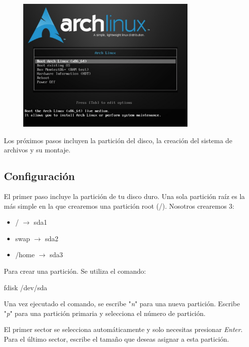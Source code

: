 \documentclass[11pt,letterpaper]{article}
\begin{document}
 \begin{figure}[H]
        \centering
        \includegraphics[width=0.8\textwidth]{img/2.png}
        \label{img:Imagen 1}
\end{figure}

Los próximos pasos incluyen la partición del disco, la creación del sistema de archivos y su montaje.

\subsection{Configuración}
El primer paso incluye la partición de tu disco duro. Una sola partición raíz es la más simple en la que crearemos una partición root (/). Nosotros crearemos 3:
\begin{itemize}
    \item / $\rightarrow$ sda1
    \item swap $\rightarrow$ sda2
    \item /home $\rightarrow$ sda3
\end{itemize}
  Para crear una partición. Se utiliza el comando:
  \begin{center}
      fdisk /dev/sda
  \end{center}
  Una vez ejecutado el comando, se escribe "\textit{n}" para una nueva partición. Escribe "\textit{p}" para una partición primaria y selecciona el número de partición.
  
  El primer sector se selecciona automáticamente y solo necesitas presionar \textit{Enter}. Para el último sector, escribe el tamaño que deseas asignar a esta partición.
 
\end{document}
